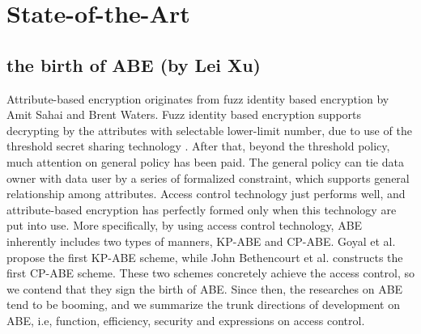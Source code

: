 \section{State-of-the-Art}
\subsection{the birth of ABE (by Lei Xu)}
Attribute-based encryption originates from fuzz identity based encryption \cite{Sahai:EUROCRYPT'05} by Amit Sahai and Brent Waters. %
Fuzz identity based encryption supports decrypting by the attributes with selectable lower-limit number,
due to use of the threshold secret sharing technology \cite{Shamir:CACM'79}.
After that, beyond the threshold policy, much attention on general policy has been paid.
The general policy can tie data owner with data user by a series of formalized constraint,
which supports general relationship among attributes.
Access control technology just performs well,
and attribute-based encryption has perfectly formed only when this technology are put into use.
More specifically, by using access control technology, ABE inherently includes two types of manners, KP-ABE and CP-ABE.
Goyal et al. \cite{Goyal:CCS'06} propose the first KP-ABE scheme,
while John Bethencourt et al. \cite{Bethencourt:SP'07} constructs the first CP-ABE scheme.
These two schemes concretely achieve the access control,
so we contend that they sign the birth of ABE.
Since then, the researches on ABE tend to be booming,
and we summarize the trunk directions of development on ABE,
i.e, function, efficiency, security and expressions on access control.
